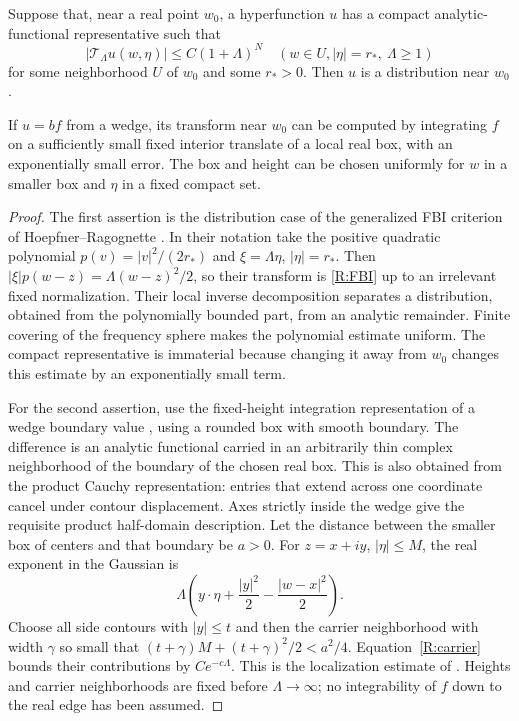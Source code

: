 \begin{lemma}\label{R:FBI-criterion}
Suppose that, near a real point $w_0$, a hyperfunction $u$ has a compact
analytic-functional representative such that
\begin{equation}\label{R:FBI-polynomial}
 |\mathcal T_\Lambda u(w,\eta)|\leq C(1+\Lambda)^N
 \quad(w\in U, |\eta|=r_*,\ \Lambda\geq1)
\end{equation}
for some neighborhood $U$ of $w_0$ and some $r_*>0$.
Then $u$ is a distribution near $w_0$.

If $u=b f$ from a wedge, its transform near $w_0$ can be computed by
integrating $f$ on a sufficiently small fixed interior translate of
a local real box, with an exponentially small error.  The box and
height can be chosen uniformly for $w$ in a smaller box and $\eta$
in a fixed compact set.
\end{lemma}

\begin{proof}
The first assertion is the distribution case of the generalized FBI
criterion of Hoepfner--Ragognette
\cite[Theorem~6.3 and Section~8.1]{HoepfnerRagognette2021}.
In their notation take the positive quadratic polynomial
$p(v)=|v|^2/(2r_*)$ and $\xi=\Lambda\eta$, $|\eta|=r_*$.
Then $|\xi|p(w-z)=\Lambda(w-z)^2/2$, so their transform is
\eqref{R:FBI} up to an irrelevant fixed normalization.  Their local
inverse decomposition separates a distribution, obtained from the
polynomially bounded part, from an analytic remainder.  Finite
covering of the frequency sphere makes the polynomial estimate
uniform.  The compact representative is immaterial because changing
it away from $w_0$ changes this estimate by an exponentially small
term.

For the second assertion, use the fixed-height integration
representation of a wedge boundary value
\cite[Remark~4.1]{HoepfnerRagognette2021}, using a rounded box with
smooth boundary.  The difference is an analytic
functional carried in an arbitrarily thin complex neighborhood of
the boundary of the chosen real box.  This is also obtained from the
product Cauchy representation: entries that extend across one
coordinate cancel under contour displacement.  Axes strictly inside
the wedge give the requisite product half-domain description.
Let the distance between the smaller box of centers and that boundary
be $a>0$.  For $z=x+iy$, $|\eta|\leq M$, the real exponent in the
Gaussian is
\begin{equation}\label{R:Gaussian-exponent}
 \Lambda\left(y\cdot\eta+\frac{|y|^2}{2}
                    -\frac{|w-x|^2}{2}\right).
\end{equation}
Choose all side contours with $|y|\leq t$ and then the carrier
neighborhood with width $\gamma$ so small that
$(t+\gamma)M+(t+\gamma)^2/2<a^2/4$.
Equation~\eqref{R:carrier} bounds their contributions by $C e^{-c\Lambda}$.
This is the localization estimate of
\cite[Proposition~4.5]{HoepfnerRagognette2021}.  Heights and carrier
neighborhoods are fixed before $\Lambda\to\infty$; no integrability
of $f$ down to the real edge has been assumed.
\end{proof}

